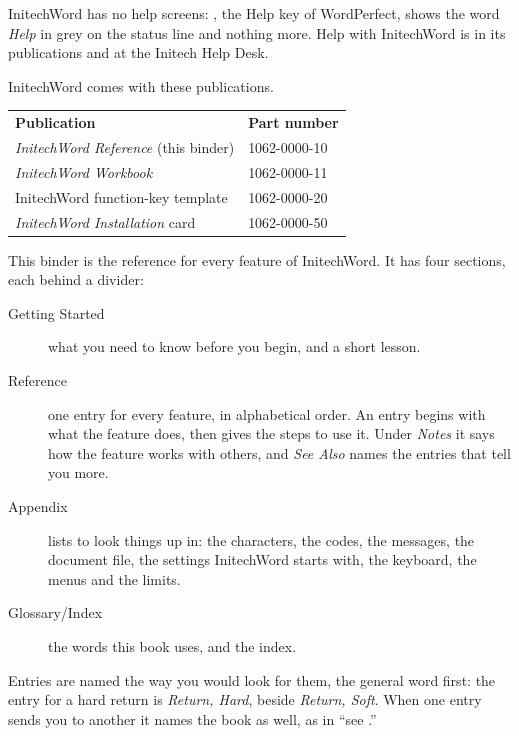 InitechWord has no help screens: , the Help key of WordPerfect, shows
the word \textit{Help} in grey on the status line and nothing more.  Help
with InitechWord is in its publications and at the Initech Help Desk.

InitechWord comes with these publications.
\par\addvspace{4pt}
\noindent\begin{tabular}{@{}ll@{}}
\textbf{Publication} & \textbf{Part number}\\
\textit{InitechWord Reference} (this binder) & 1062-0000-10\\
\textit{InitechWord Workbook} & 1062-0000-11\\
InitechWord function-key template & 1062-0000-20\\
\textit{InitechWord Installation} card & 1062-0000-50\\
\end{tabular}
\par\addvspace{4pt}

This binder is the reference for every feature of InitechWord.  It has four
sections, each behind a divider:
\begin{description}
\item[Getting Started] what you need to know before you begin, and a short
lesson.
\item[Reference] one entry for every feature, in alphabetical order.  An
entry begins with what the feature does, then gives the steps to use it.
Under \textit{Notes} it says how the feature works with others, and
\textit{See Also} names the entries that tell you more.
\item[Appendix] lists to look things up in: the characters, the codes, the
messages, the document file, the settings InitechWord starts with, the
keyboard, the menus and the limits.
\item[Glossary/Index] the words this book uses, and the index.
\end{description}
Entries are named the way you would look for them, the general word first:
the entry for a hard return is \textit{Return, Hard}, beside \textit{Return,
Soft}.  When one entry sends you to another it names the book as well, as in
``see .''


